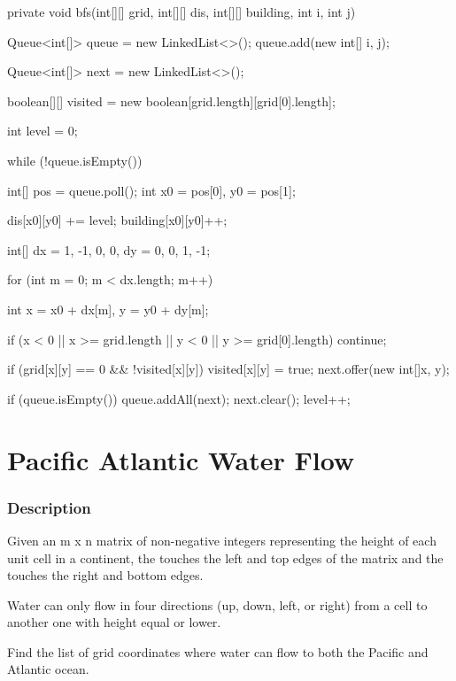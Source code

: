 \newpage

\begin{Code}
private void bfs(int[][] grid, int[][] dis, int[][] building, int i, int j) {
    Queue<int[]> queue = new LinkedList<>();
    queue.add(new int[] {i, j});

    Queue<int[]> next = new LinkedList<>();

    boolean[][] visited = new boolean[grid.length][grid[0].length];

    int level = 0;

    while (!queue.isEmpty()) {
        int[] pos = queue.poll();
        int x0 = pos[0], y0 = pos[1];

        dis[x0][y0] += level;
        building[x0][y0]++;

        int[] dx = {1, -1, 0, 0}, dy = {0, 0, 1, -1};

        for (int m = 0; m < dx.length; m++) {
            int x = x0 + dx[m], y = y0 + dy[m];

            if (x < 0 || x >= grid.length || y < 0 || y >= grid[0].length) {
                continue;
            }

            if (grid[x][y] == 0 && !visited[x][y]) {
                visited[x][y] = true;
                next.offer(new int[]{x, y});
            }
        }

        if (queue.isEmpty()) {
            queue.addAll(next);
            next.clear();
            level++;
        }
    }
}
\end{Code}

\newpage

\section{Pacific Atlantic Water Flow} %

\subsubsection{Description}

Given an m x n matrix of non-negative integers representing the height of each unit cell in a continent, the  touches the left and top edges of the matrix and the  touches the right and bottom edges.

Water can only flow in four directions (up, down, left, or right) from a cell to another one with height equal or lower.

Find the list of grid coordinates where water can flow to both the Pacific and Atlantic ocean.

